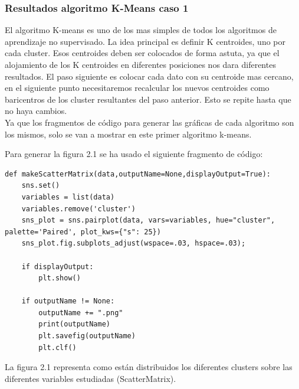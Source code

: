 	\subsubsection{Resultados algoritmo K-Means caso 1}

	El algoritmo K-means es uno de los mas simples de todos los algoritmos de aprendizaje no supervisado. 
	La idea principal es definir K centroides, uno por cada cluster. Esos centroides deben ser colocados de forma astuta,
	ya que el alojamiento de los K centroides en diferentes posiciones nos dara diferentes resultados. El paso siguiente
	es colocar cada dato con su centroide mas cercano, en el siguiente punto necesitaremos recalcular los nuevos centroides
	como baricentros de los cluster resultantes del paso anterior. Esto se repite hasta que no haya cambios. \\
	
	Ya que los fragmentos de código para generar las gráficas de cada algoritmo son los mismos, 
	solo se van a mostrar en este primer algoritmo k-means.

	Para generar la figura 2.1 se ha usado el siguiente fragmento de código: 

	\lstset{language=python}
	\begin{lstlisting}[frame=single]
def makeScatterMatrix(data,outputName=None,displayOutput=True):
	sns.set()
	variables = list(data)
	variables.remove('cluster')
	sns_plot = sns.pairplot(data, vars=variables, hue="cluster", palette='Paired', plot_kws={"s": 25})
	sns_plot.fig.subplots_adjust(wspace=.03, hspace=.03);

	if displayOutput:
		plt.show()

	if outputName != None:
		outputName += ".png"
		print(outputName)
		plt.savefig(outputName)
		plt.clf()
	\end{lstlisting}

	La figura 2.1 representa como están distribuidos los diferentes clusters sobre las diferentes variables estudiadas (ScatterMatrix).\\

